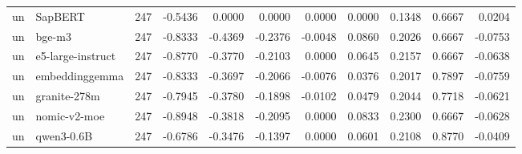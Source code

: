 \begin{tabular}{llrrrrrrrrr}
un & SapBERT & 247 & -0.5436 & 0.0000 & 0.0000 & 0.0000 & 0.0000 & 0.1348 & 0.6667 & 0.0204 \\
un & bge-m3 & 247 & -0.8333 & -0.4369 & -0.2376 & -0.0048 & 0.0860 & 0.2026 & 0.6667 & -0.0753 \\
un & e5-large-instruct & 247 & -0.8770 & -0.3770 & -0.2103 & 0.0000 & 0.0645 & 0.2157 & 0.6667 & -0.0638 \\
un & embeddinggemma & 247 & -0.8333 & -0.3697 & -0.2066 & -0.0076 & 0.0376 & 0.2017 & 0.7897 & -0.0759 \\
un & granite-278m & 247 & -0.7945 & -0.3780 & -0.1898 & -0.0102 & 0.0479 & 0.2044 & 0.7718 & -0.0621 \\
un & nomic-v2-moe & 247 & -0.8948 & -0.3818 & -0.2095 & 0.0000 & 0.0833 & 0.2300 & 0.6667 & -0.0628 \\
un & qwen3-0.6B & 247 & -0.6786 & -0.3476 & -0.1397 & 0.0000 & 0.0601 & 0.2108 & 0.8770 & -0.0409 \\
\bottomrule
\end{tabular}
